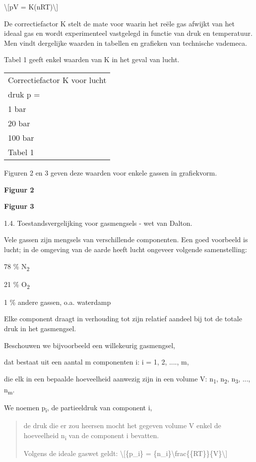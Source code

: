 \documentclass[]{article}
\begin{document}
\textbackslash{}{[}pV = K(nRT)\textbackslash{}{]}

De correctiefactor K stelt de mate voor waarin het reële gas afwijkt van
het ideaal gas en wordt experimenteel vastgelegd in functie van druk en
temperatuur. Men vindt dergelijke waarden in tabellen en grafieken van
technische vademeca.

Tabel 1 geeft enkel waarden van K in het geval van lucht.

\begin{longtable}[c]{@{}l@{}}
\toprule
Correctiefactor K voor lucht\tabularnewline
druk p =\tabularnewline
1 bar\tabularnewline
20 bar\tabularnewline
100 bar\tabularnewline
Tabel 1\tabularnewline
\bottomrule
\end{longtable}

Figuren 2 en 3 geven deze waarden voor enkele gassen in grafiekvorm.

\textbf{Figuur 2 }

\textbf{Figuur 3}

1.4. Toestandsvergelijking voor gasmengsels - wet van Dalton.

Vele gassen zijn mengsels van verschillende componenten. Een goed
voorbeeld is lucht; in de omgeving van de aarde heeft lucht ongeveer
volgende samenstelling:

78 \% N\textsubscript{2}

21 \% O\textsubscript{2}

1 \% andere gassen, o.a. waterdamp

Elke component draagt in verhouding tot zijn relatief aandeel bij tot de
totale druk in het gasmengsel.

Beschouwen we bijvoorbeeld een willekeurig gasmengsel,

dat bestaat uit een aantal m componenten i: i = 1, 2, ...., m,

die elk in een bepaalde hoeveelheid aanwezig zijn in een volume V:
n\textsubscript{1}, n\textsubscript{2}, n\textsubscript{3}, ...,
n\textsubscript{m}.

We noemen p\textsubscript{i}, de partieeldruk van component i,

\begin{quote}
de druk die er zou heersen mocht het gegeven volume V enkel de
hoeveelheid n\textsubscript{i} van de component i bevatten.

Volgens de ideale gaswet geldt: \textbackslash{}{[}\{p\_i\} =
\{n\_i\}\textbackslash{}frac\{\{RT\}\}\{V\}\textbackslash{}{]}
\end{quote}
\end{document}
